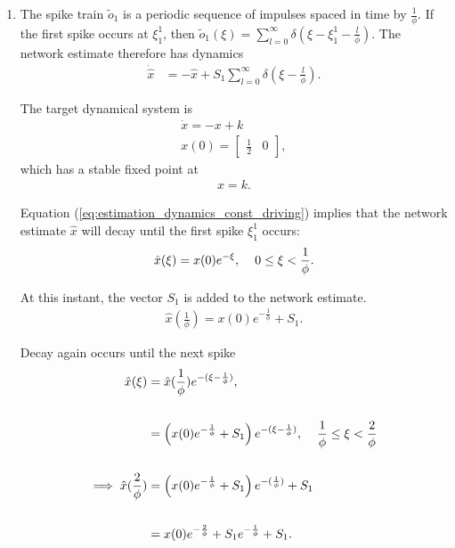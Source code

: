 \begin{enumerate}
\item The spike train $\tilde{o}_1$ is a periodic sequence of impulses spaced in time by $\frac{1}{\phi}$. If the first spike occurs at $\xi_1^1$, then $\tilde{o}_1(\xi) = \sum_{l=0}^{\infty} \delta \left(\xi-\xi_1^1 - \frac{l}{\phi}\right).$
The network estimate therefore has dynamics
\begin{align}
\label{eq:estimation_dynamics_const_driving}
\dot{\hat{x}} &= -\hat{x}  + S_1 \sum_{l=0}^{\infty} \delta \left(\xi - \frac{l}{\phi}\right).
\end{align}

The target dynamical system is
\begin{align*}
\dot{x} = - x + k 
\\
 x(0) = \begin{bmatrix} \frac{1}{2} & 0 \end{bmatrix},
\end{align*}
which has a stable fixed point at
\begin{align}
\label{eq:steady_state_dynamics_const_driving}
x = k.
\end{align}

Equation (\ref{eq:estimation_dynamics_const_driving}) implies that the network estimate $\hat{x}$ will decay until the first spike $\xi_1^1$ occurs:
\begin{align*}
\hat{x}(\xi) = x(0) e^{-\xi}, \hspace{4mm} 0 \leq \xi < \frac{1}{\phi}.
\end{align*}


 At this instant, the vector $S_1$ is added to the network estimate.
 \begin{align*}
 \hat{x}( \frac{1}{\phi}) =  x(0) e^{- \frac{1}{\phi}} + S_1.
 \end{align*}
 
Decay again occurs until the next spike
\begin{align*}
\hat{x}(\xi) &= \hat{x}(\frac{1}{\phi}) e^{-(\xi - \frac{1}{\phi})}, \\
\\
&= \left( x(0) e^{- \frac{1}{\phi}} + S_1 \right)e^{-(\xi - \frac{1}{\phi})} , \hspace{4mm} 
\frac{1}{\phi} \leq \xi < \frac{2}{\phi}\\
\\
\implies
\hat{x}(\frac{2}{\phi}) &= \left( x(0) e^{- \frac{1}{\phi}} + S_1 \right) e^{-(\frac{1}{\phi})} + S_1\\
\\
&= x(0)
e^{-\frac{2}{\phi}} + S_1 e^{-\frac{1}{\phi}} 
+ S_1.
\end{align*}


\end{enumerate}
